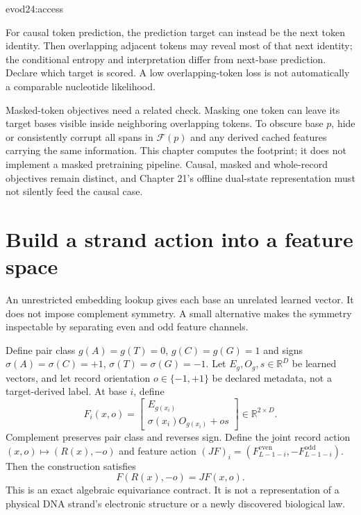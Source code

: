 {evod24:access}

For causal token prediction, the prediction target can instead be the next token
identity. Then overlapping adjacent tokens may reveal most of that next identity;
the conditional entropy and interpretation differ from next-base prediction.
Declare which target is scored. A low overlapping-token loss is not automatically
a comparable nucleotide likelihood.

Masked-token objectives need a related check. Masking one token can leave its
target bases visible inside neighboring overlapping tokens. To obscure base $p$,
hide or consistently corrupt all spans in $\mathcal F(p)$ and any derived cached
features carrying the same information. This chapter computes the footprint; it
does not implement a masked pretraining pipeline. Causal, masked and whole-record
objectives remain distinct, and Chapter 21's offline dual-state representation
must not silently feed the causal case.

\section{Build a strand action into a feature space}
An unrestricted embedding lookup gives each base an unrelated learned vector.
It does not impose complement symmetry. A small alternative makes the symmetry
inspectable by separating even and odd feature channels.

Define pair class $g(A)=g(T)=0$, $g(C)=g(G)=1$ and signs
$\sigma(A)=\sigma(C)=+1$, $\sigma(T)=\sigma(G)=-1$.
Let $E_g,O_g,s\in\mathbb R^D$ be learned vectors, and let record orientation
$o\in\{-1,+1\}$ be declared metadata, not a target-derived label.
At base $i$, define
\begin{equation}
F_i(x,o)=
\begin{bmatrix}
E_{g(x_i)}\\
\sigma(x_i)O_{g(x_i)}+os
\end{bmatrix}
\in\mathbb R^{2\times D}.
\label{evod24:strand-definition}
\end{equation}
Complement preserves pair class and reverses sign. Define the joint record action
$(x,o)\mapsto(R(x),-o)$ and feature action
$(JF)_i=(F_{L-1-i}^{\mathrm{even}},-F_{L-1-i}^{\mathrm{odd}})$.
Then the construction satisfies
\[
F(R(x),-o)=JF(x,o).
\]
This is an exact algebraic equivariance contract. It is not a representation of a
physical DNA strand's electronic structure or a newly discovered biological law.

